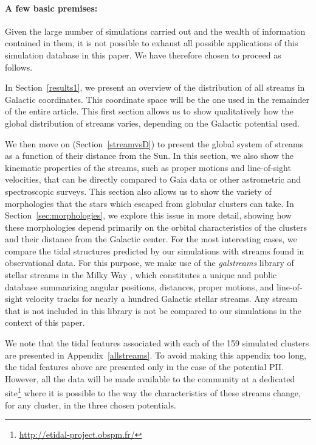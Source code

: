     \paragraph{A few basic premises:}
    Given the large number of simulations carried out and the wealth of information contained in them, it is not possible to exhaust all possible applications of this simulation database in this paper. We have therefore chosen to proceed as follows. 

    In Section~\ref{results1}, we present an overview of the distribution of all streams in  Galactic coordinates. This coordinate space will be the one used in the remainder of the entire article. This first section allows us to show qualitatively how the global distribution of streams varies, depending on the Galactic potential used.

    We  then move on (Section~\ref{streamvsD}) to present the global system of streams as a function of their distance from the Sun. In this section, we also show the kinematic properties of the streams, such as proper motions and line-of-sight velocities, that can be directly compared to Gaia data or other astrometric and spectroscopic surveys. This section also allows us to show the variety of morphologies that the stars which escaped from globular clusters can take. In Section~\ref{sec:morphologies}, we explore this issue in more detail, showing how these morphologies depend primarily on the orbital characteristics of the clusters and their distance from the Galactic center. For the most interesting cases, we compare the tidal structures predicted by our simulations with streams found in observational data. For this purpose, we make use of the \emph{galstreams} library of stellar streams in the Milky Way \citep{2023MNRAS.520.5225M}, which constitutes a unique and public database summarizing angular positions, distances, proper motions, and line-of-sight velocity tracks for nearly a hundred Galactic stellar streams. Any stream that is not included in this library is not be compared to our simulations in the context of this paper.

    We note that the tidal features associated with each of the 159 simulated clusters are presented in Appendix~\ref{allstreams}. To avoid making this appendix too long, the  tidal features above are presented only in the case of the potential PII. However, all the data will be made available to the community at a dedicated site\footnote{\url{http://etidal-project.obspm.fr/}} where it is possible to  the way the characteristics of these streams change, for any cluster, in the three chosen potentials. 

